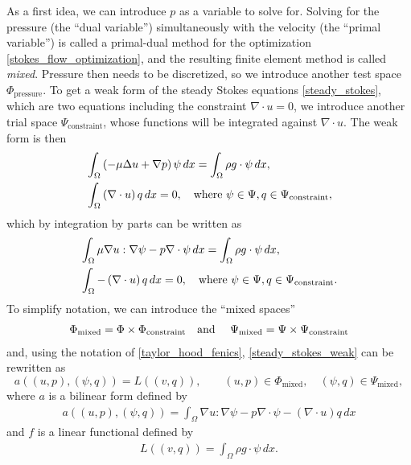 \newcommand{\trialconstraint}{{\Psi_{\text{constraint}}}}
\newcommand{\testpressure}{{\Phi_{\text{pressure}}}}
As a first idea, we can introduce $p$ as a variable to solve for. Solving for the pressure (the ``dual variable'') simultaneously with the velocity
(the ``primal variable'')
is called a primal-dual method for the optimization \eqref{stokes_flow_optimization}, and the resulting finite element method is called \textit{mixed}.
Pressure then needs to be discretized, so we introduce another test space $\testpressure$.
To get a weak form of the steady Stokes equations \eqref{steady_stokes}, which are two equations including the constraint $\nabla\cdot u = 0$, we introduce
another trial space $\trialconstraint$, whose functions will be integrated against $\nabla\cdot u$. The weak form is then
\begin{equation*}
\begin{split}
    &\int_\om \left(-\mu\Delta u + \nabla p\right)\psi\,dx = \int_\Omega \rho g\cdot\psi\,dx,\\
    &\int_\om \left(\nabla\cdot u\right) q\,dx = 0, \quad\text{where $\psi \in \Psi, q \in \trialconstraint$},
\end{split}
\end{equation*}
which by integration by parts can be written as
\begin{equation}\label{steady_stokes_weak}
\begin{split}
    &\int_\om \mu\nabla u : \nabla \psi - p\nabla\cdot \psi\,dx = \int_\om \rho g\cdot \psi\,dx,\\
    &\int_\om -\left(\nabla\cdot u\right)q\,dx = 0, \quad\text{where $\psi \in \Psi, q \in \trialconstraint$}.
\end{split}
\end{equation}
To simplify notation, we can introduce the ``mixed spaces''
\begin{align*}
    \Phi_{\text{mixed}} = \Phi \times \Phi_{\text{constraint}}
    \text{\quad and \quad}
    \Psi_{\text{mixed}} = \Psi \times \Psi_{\text{constraint}}
\end{align*}
and, using the notation of \ref{taylor_hood_fenics}, \eqref{steady_stokes_weak} can be rewritten as
\begin{equation}\label{steady_stokes_bilinear_form}
    a((u, p), (\psi, q)) = L((v, q)), \quad\quad (u,p) \in \Phi_{\text{mixed}},\quad (\psi, q) \in \Psi_{\text{mixed}},
\end{equation}
where $a$ is a bilinear form defined by
\begin{align*}
    a((u, p), (\psi, q)) = \int_\Omega \nabla u : \nabla\psi - p\nabla\cdot \psi - \left(\nabla\cdot u\right)q\,dx
\end{align*}
and $f$ is a linear functional defined by
\begin{align*}
    L((v, q)) = \int_\Omega \rho g\cdot\psi\,dx.
\end{align*}

